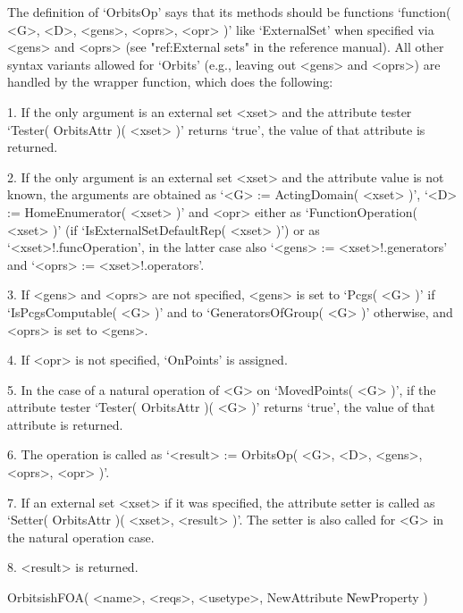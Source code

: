 The definition  of `OrbitsOp' says that its  methods should  be functions
`function( <G>, <D>,  <gens>,  <oprs>, <opr> )'  like  `ExternalSet' when
specified via <gens> and <oprs> (see "ref:External sets" in the reference
manual). All other  syntax variants allowed  for  `Orbits' (e.g., leaving
out <gens>  and <oprs>) are handled by  the wrapper function,  which does
the following:
\beginlist
  \item{1.}
    If the only  argument  is an  external  set <xset> and the  attribute
    tester `Tester( OrbitsAttr )( <xset> )' returns  `true', the value of
    that attribute is returned.
  \item{2.}
    If the  only argument is   an external set  <xset> and  the attribute
    value is  not  known,  the    arguments are  obtained as   `<G>    :=
    ActingDomain( <xset> )', `<D> := HomeEnumerator(  <xset> )' and <opr>
    either as `FunctionOperation( <xset> )' (if `IsExternalSetDefaultRep(
    <xset> )') or  as `<xset>!.funcOperation',  in  the latter case  also
    `<gens> := <xset>!.generators' and `<oprs> := <xset>!.operators'.
  \item{3.}
    If <gens> and <oprs>  are not specified, <gens> is  set to `Pcgs( <G>
    )'   if `IsPcgsComputable( <G> )'   and to `GeneratorsOfGroup( <G> )'
    otherwise, and <oprs> is set to <gens>.
  \item{4.}
    If <opr> is not specified, `OnPoints' is assigned.
  \item{5.}
    In the case of a natural operation of <G> on `MovedPoints( <G> )', if
    the  attribute tester `Tester( OrbitsAttr )(   <G> )' returns `true',
    the value of that attribute is returned.
  \item{6.}
    The  operation is called as `<result>  := OrbitsOp( <G>, <D>, <gens>,
    <oprs>, <opr> )'.
  \item{7.}
    If an  external set <xset> if  it was specified, the attribute setter
    is  called as `Setter( OrbitsAttr  )( <xset>, <result> )'. The setter
    is also called for <G> in the natural operation case.
  \item{8.}
    <result> is returned.
\endlist

\>OrbitsishFOA( <name>, <reqs>, <usetype>, NewAttribute \| NewProperty )

